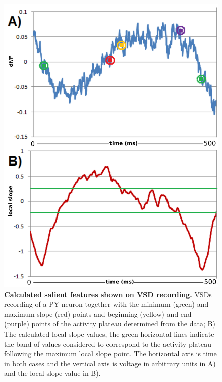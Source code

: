 \begin{figure}[H]
	\begin{center}
		\includegraphics[width=\columnwidth]{graphics/vsd_recording.png}
		\caption[Calculated salient features shown on \ac{VSD} recording.]{\textbf{Calculated salient features shown on \ac{VSD} recording.} \Acp{VSD} recording of a PY neuron together with the minimum (green) and maximum slope (red) points and beginning (yellow) and end (purple) points  of the activity plateau determined from the data; B) The calculated local slope values, the green horizontal lines indicate the band of values considered to correspond to the activity plateau following the maximum local slope point. The horizontal axis is time in both cases and the vertical axis is voltage in arbitrary units in A) and the local slope value in B).}
		\label{fig:vsd_recording}
	\end{center}
\end{figure}

